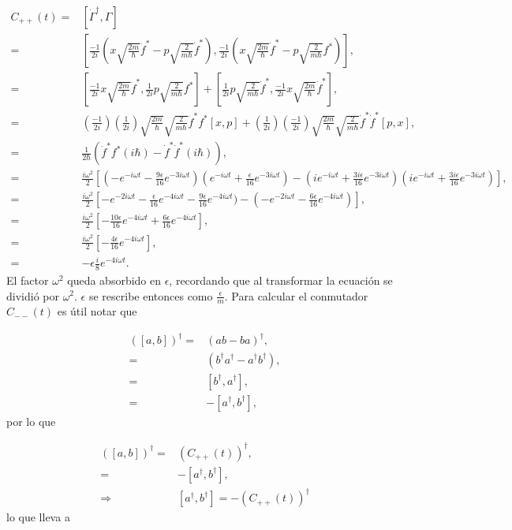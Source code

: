 \documentclass[a4paper,10pt]{report}
\begin{document}
\begin{align*}
C_{++}(t) =& [\dot{\Gamma}^\dagger,\Gamma]\\
 =&[\frac{-1}{2i}(x\sqrt{\frac{2m}{\hbar}}\ddot{f}^*-p\sqrt{\frac{2}{m\hbar}}\dot{f}^*),\frac{-1}{2i}(x\sqrt{\frac{2m}{\hbar}}\dot{f}^*-p\sqrt{\frac{2}{m\hbar}}f^*)],\\
 =&[\frac{-1}{2i}x\sqrt{\frac{2m}{\hbar}}\ddot{f}^*,\frac{1}{2i}p\sqrt{\frac{2}{m\hbar}}f^*]+[\frac{1}{2i}p\sqrt{\frac{2}{m\hbar}}\dot{f}^*,\frac{-1}{2i}x\sqrt{\frac{2m}{\hbar}}\dot{f}^*],\\
 =&(\frac{-1}{2i})(\frac{1}{2i})\sqrt{\frac{2m}{\hbar}}\sqrt{\frac{2}{m\hbar}}\ddot{f}^*f^*[x,p]+(\frac{1}{2i})(\frac{-1}{2i})\sqrt{\frac{2m}{\hbar}}\sqrt{\frac{2}{m\hbar}}\dot{f}^*\dot{f}^*[p,x],\\
 =&\frac{1}{2\hbar}(\ddot{f}^*f^*(i\hbar)-\dot{f}^*\dot{f}^*(i\hbar)),\\
 =&\frac{i\omega^2}{2}[(-e^{-i\omega t}-\frac{9\epsilon}{16}e^{-3i\omega t})(e^{-i\omega t}+\frac{\epsilon}{16}e^{-3i\omega t})-(ie^{-i\omega t}+\frac{3i\epsilon}{16}e^{-3i\omega t})(ie^{-i\omega t}+\frac{3i\epsilon}{16}e^{-3i\omega t})],\\ 
 =&\frac{i\omega^2}{2}[-e^{-2i\omega t}-\frac{\epsilon}{16}e^{-4i\omega t}-\frac{9\epsilon}{16}e^{-4i\omega t})-(-e^{-2i\omega t}-\frac{6\epsilon}{16}e^{-4i\omega t})],\\
 =&\frac{i\omega^2}{2}[-\frac{10\epsilon}{16}e^{-4i\omega t}+\frac{6\epsilon}{16}e^{-4i\omega t}],\\
 =&\frac{i\omega^2}{2}[-\frac{4\epsilon}{16}e^{-4i\omega t}],\\
 =&-\epsilon\frac{i}{8}e^{-4i\omega t}.
\end{align*} El factor $\omega^2$ queda absorbido en $\epsilon$, recordando que al transformar la ecuación se dividió por $\omega^2$.  $\epsilon$ se rescribe entonces como $\frac{\epsilon}{m}$. Para calcular el conmutador $C_{--}(t)$ es útil notar que

\begin{align*}
([a,b])^{\dagger} =& (ab-ba)^{\dagger}, \\
=& (b^{\dagger}a^{\dagger}-a^{\dagger}b^{\dagger}),\\
=& [b^{\dagger},a^{\dagger}],\\
=& -[a^{\dagger},b^{\dagger}], 
\end{align*} por lo que

\begin{align*}
([a,b])^{\dagger} =& (C_{++}(t))^{\dagger},\\
=& -[a^{\dagger},b^{\dagger}],\\
\Rightarrow & [a^{\dagger},b^{\dagger}] = -(C_{++}(t))^{\dagger}
\end{align*} lo que lleva a
\end{document}
